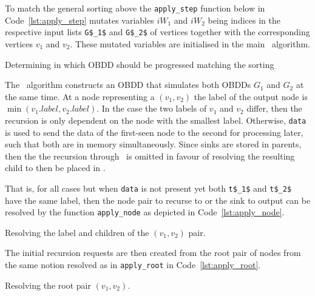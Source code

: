 To match the general sorting above the \lstinline{apply_step} function below in
Code~\ref{lst:apply_step} mutates variables $\mathit{iW}_1$ and $\mathit{iW}_2$
being indices in the respective input lists \lstinline{G$_1$} and
\lstinline{G$_2$} of vertices together with the corresponding vertices $v_1$ and
$v_2$. These mutated variables are initialised in the main \Apply\ algorithm.
\begin{lstfloat}
  \centering

  

  \caption{Determining in which OBDD should be progressed matching the sorting}
  \label{lst:apply_step}
\end{lstfloat}

The \Apply\ algorithm constructs an OBDD that simulates both OBDDs $G_1$ and
$G_2$ at the same time. At a node representing a $(v_1,v_2)$ the label of the
output node is $\min(v_1.\mathit{label},v_2.\mathit{label})$. In the case the
two labels of $v_1$ and $v_2$ differ, then the recursion is only dependent on
the node with the smallest label. Otherwise, \lstinline{data} is used to send
the data of the first-seen node to the second for processing later, such that
both are in memory simultaneously. Since sinks are stored in parents, then the
the recursion through \ApplyQrec\ is omitted in favour of resolving the
resulting child to then be placed in \ReduceQdep.

That is, for all cases but when \lstinline{data} is not present yet both
\lstinline{t$_1$} and \lstinline{t$_2$} have the same label, then the node pair
to recurse to or the sink to output can be resolved by the function
\lstinline{apply_node} as depicted in Code~\ref{lst:apply_node}.
\begin{lstfloat}[ht!]
  \centering

  

  \caption{Resolving the label and children of the $(v_1, v_2)$ pair.}
  \label{lst:apply_node}
\end{lstfloat}

\newpage
The initial recursion requests are then created from the root pair of nodes from
the same notion resolved as in \lstinline{apply_root} in
Code~\ref{lst:apply_root}.
\begin{lstfloat}[hb!]
  \centering

  

  \caption{Resolving the root pair $(v_1, v_2)$.}
  \label{lst:apply_root}
\end{lstfloat}

